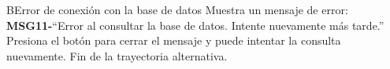 \begin{UCtrayectoriaA}{B}{Error de conexión con la base de datos}
	\UCpaso[\UCactor] Muestra un mensaje de error: {\bf MSG11-}{``Error al consultar la base de datos. Intente nuevamente más tarde.''}
	\UCpaso[\UCactor] Presiona el botón  para cerrar el mensaje y puede intentar la consulta nuevamente.
	\UCpaso Fin de la trayectoria alternativa.
\end{UCtrayectoriaA}

